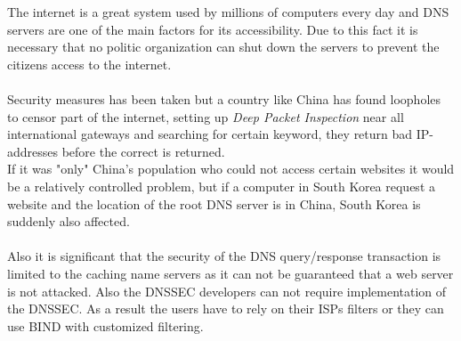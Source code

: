 \documentclass[a4paper,10pt]{report}
\begin{document}
The internet is a great system used by millions of computers every day and DNS servers are one of the main factors for its accessibility. 
Due to this fact it is necessary that no politic organization can shut down the servers to prevent the citizens access to the internet.
\\
\\
Security measures has been taken but a country like China has found loopholes to censor part of the internet, setting up \textit{Deep Packet Inspection} near all international gateways and searching for certain keyword, they  return bad IP-addresses before the correct is returned\cite{GFW}.\\
If it was "only" China's population who could not access certain websites it would be a relatively controlled problem, but if a computer in South Korea request a website and the location of the root DNS server is in China, South Korea is suddenly also affected.
\\
\\
Also it is significant that the security of the DNS query/response transaction is limited to the caching name servers as it can not be guaranteed that a web server is not attacked. Also the DNSSEC developers can not require implementation of the DNSSEC. As a result the users have to rely on their ISPs filters or they can use BIND with customized filtering.





\end{document}
